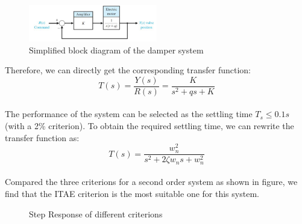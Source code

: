 \documentclass{article}
\begin{document}
\begin{figure}[htbp]
    \centering
    \includegraphics[width=0.5\textwidth]{6.jpg}
    \caption{Simplified block diagram of the damper system}
\end{figure}

Therefore, we can directly get the corresponding transfer function:
\begin{equation*}
    T(s)=\frac{Y(s)}{R(s)}=\frac{K}{s^2+qs+K}
\end{equation*}\\

The performance of the system can be selected as the settling time $T_s\leq 0.1s$ (with a 2\% criterion).
To obtain the required settling time, we can rewrite the transfer function as:
\begin{equation*}
    T(s)=\frac{w_n^2}{s^2+2\zeta w_ns+w_n^2}
\end{equation*}\\

Compared the three criterions for a second order system as shown in figure,
we find that the ITAE criterion is the most suitable one for this system.\\

\begin{figure}
    \centering
    \caption{Step Response of different criterions}
\end{figure}
\end{document}
